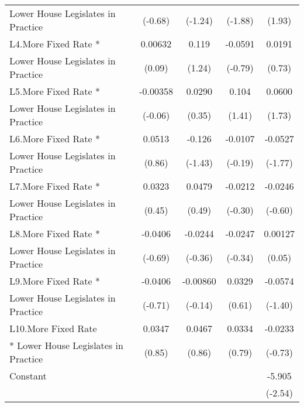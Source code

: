 {\begin{tabular}{l*{4}{c}}
Lower House Legislates in Practice&     (-0.68)         &     (-1.24)         &     (-1.88)         &      (1.93)         \\
[1em]
L4.More Fixed Rate *&     0.00632         &       0.119         &     -0.0591         &      0.0191         \\
Lower House Legislates in Practice&      (0.09)         &      (1.24)         &     (-0.79)         &      (0.73)         \\
[1em]
L5.More Fixed Rate *&    -0.00358         &      0.0290         &       0.104         &      0.0600         \\
Lower House Legislates in Practice&     (-0.06)         &      (0.35)         &      (1.41)         &      (1.73)         \\
[1em]
L6.More Fixed Rate *&      0.0513         &      -0.126         &     -0.0107         &     -0.0527         \\
Lower House Legislates in Practice&      (0.86)         &     (-1.43)         &     (-0.19)         &     (-1.77)         \\
[1em]
L7.More Fixed Rate *&      0.0323         &      0.0479         &     -0.0212         &     -0.0246         \\
Lower House Legislates in Practice&      (0.45)         &      (0.49)         &     (-0.30)         &     (-0.60)         \\
[1em]
L8.More Fixed Rate *&     -0.0406         &     -0.0244         &     -0.0247         &     0.00127         \\
Lower House Legislates in Practice&     (-0.69)         &     (-0.36)         &     (-0.34)         &      (0.05)         \\
[1em]
L9.More Fixed Rate *&     -0.0406         &    -0.00860         &      0.0329         &     -0.0574         \\
Lower House Legislates in Practice&     (-0.71)         &     (-0.14)         &      (0.61)         &     (-1.40)         \\
[1em]
L10.More Fixed Rate &      0.0347         &      0.0467         &      0.0334         &     -0.0233         \\
* Lower House Legislates in Practice&      (0.85)         &      (0.86)         &      (0.79)         &     (-0.73)         \\
[1em]
Constant            &                     &                     &                     &      -5.905\sym{*}  \\
                    &                     &                     &                     &     (-2.54)         \\

\end{tabular}}

